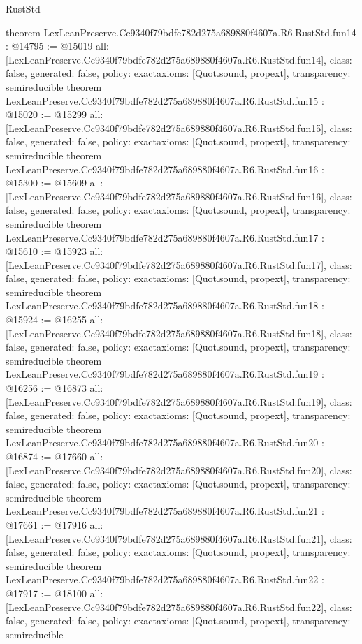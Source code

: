 \begin{lexlean}{RustStd}
\begin{coremodule}
{}
theorem LexLeanPreserve.Cc9340f79bdfe782d275a689880f4607a.R6.RustStd.fun14 : @14795 := @15019 {
  all: [LexLeanPreserve.Cc9340f79bdfe782d275a689880f4607a.R6.RustStd.fun14],
  class: false,
  generated: false,
  policy: exact{axioms: [Quot.sound, propext]},
  transparency: semireducible
}
theorem LexLeanPreserve.Cc9340f79bdfe782d275a689880f4607a.R6.RustStd.fun15 : @15020 := @15299 {
  all: [LexLeanPreserve.Cc9340f79bdfe782d275a689880f4607a.R6.RustStd.fun15],
  class: false,
  generated: false,
  policy: exact{axioms: [Quot.sound, propext]},
  transparency: semireducible
}
theorem LexLeanPreserve.Cc9340f79bdfe782d275a689880f4607a.R6.RustStd.fun16 : @15300 := @15609 {
  all: [LexLeanPreserve.Cc9340f79bdfe782d275a689880f4607a.R6.RustStd.fun16],
  class: false,
  generated: false,
  policy: exact{axioms: [Quot.sound, propext]},
  transparency: semireducible
}
theorem LexLeanPreserve.Cc9340f79bdfe782d275a689880f4607a.R6.RustStd.fun17 : @15610 := @15923 {
  all: [LexLeanPreserve.Cc9340f79bdfe782d275a689880f4607a.R6.RustStd.fun17],
  class: false,
  generated: false,
  policy: exact{axioms: [Quot.sound, propext]},
  transparency: semireducible
}
theorem LexLeanPreserve.Cc9340f79bdfe782d275a689880f4607a.R6.RustStd.fun18 : @15924 := @16255 {
  all: [LexLeanPreserve.Cc9340f79bdfe782d275a689880f4607a.R6.RustStd.fun18],
  class: false,
  generated: false,
  policy: exact{axioms: [Quot.sound, propext]},
  transparency: semireducible
}
theorem LexLeanPreserve.Cc9340f79bdfe782d275a689880f4607a.R6.RustStd.fun19 : @16256 := @16873 {
  all: [LexLeanPreserve.Cc9340f79bdfe782d275a689880f4607a.R6.RustStd.fun19],
  class: false,
  generated: false,
  policy: exact{axioms: [Quot.sound, propext]},
  transparency: semireducible
}
theorem LexLeanPreserve.Cc9340f79bdfe782d275a689880f4607a.R6.RustStd.fun20 : @16874 := @17660 {
  all: [LexLeanPreserve.Cc9340f79bdfe782d275a689880f4607a.R6.RustStd.fun20],
  class: false,
  generated: false,
  policy: exact{axioms: [Quot.sound, propext]},
  transparency: semireducible
}
theorem LexLeanPreserve.Cc9340f79bdfe782d275a689880f4607a.R6.RustStd.fun21 : @17661 := @17916 {
  all: [LexLeanPreserve.Cc9340f79bdfe782d275a689880f4607a.R6.RustStd.fun21],
  class: false,
  generated: false,
  policy: exact{axioms: [Quot.sound, propext]},
  transparency: semireducible
}
theorem LexLeanPreserve.Cc9340f79bdfe782d275a689880f4607a.R6.RustStd.fun22 : @17917 := @18100 {
  all: [LexLeanPreserve.Cc9340f79bdfe782d275a689880f4607a.R6.RustStd.fun22],
  class: false,
  generated: false,
  policy: exact{axioms: [Quot.sound, propext]},
  transparency: semireducible
}
\end{coremodule}
\end{lexlean}
